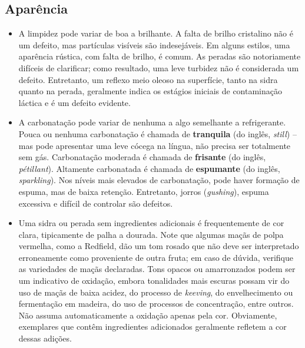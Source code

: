 \subsection*{Aparência}

\begin{itemize}
\item A limpidez pode variar de boa a brilhante. A falta de brilho cristalino não é um defeito, mas partículas visíveis são indesejáveis. Em alguns estilos, uma aparência rústica, com falta de brilho, é comum. As peradas são notoriamente difíceis de clarificar; como resultado, uma leve turbidez não é considerada um defeito. Entretanto, um reflexo meio oleoso na superfície, tanto na sidra quanto na perada, geralmente indica os estágios iniciais de contaminação láctica e é um defeito evidente.
\item A carbonatação pode variar de nenhuma a algo semelhante a refrigerante. Pouca ou nenhuma carbonatação é chamada de \textbf{tranquila} (do inglês, \textit{still}) – mas pode apresentar uma leve cócega na língua, não precisa ser totalmente sem gás. Carbonatação moderada é chamada de \textbf{frisante} (do inglês, \textit{pétillant}). Altamente carbonatada é chamada de \textbf{espumante} (do inglês, \textit{sparkling}). Nos níveis mais elevados de carbonatação, pode haver formação de espuma, mas de baixa retenção. Entretanto, jorros (\textit{gushing}), espuma excessiva e difícil de controlar são defeitos.
\item Uma sidra ou perada sem ingredientes adicionais é frequentemente de cor clara, tipicamente de palha a dourada. Note que algumas maçãs de polpa vermelha, como a Redfield, dão um tom rosado que não deve ser interpretado erroneamente como proveniente de outra fruta; em caso de dúvida, verifique as variedades de maçãs declaradas. Tons opacos ou amarronzados podem ser um indicativo de oxidação, embora tonalidades mais escuras possam vir do uso de maçãs de baixa acidez, do processo de \textit{keeving}, do envelhecimento ou fermentação em madeira, do uso de processos de concentração, entre outros. Não assuma automaticamente a oxidação apenas pela cor. Obviamente, exemplares que contêm ingredientes adicionados geralmente refletem a cor dessas adições.
\end{itemize}

